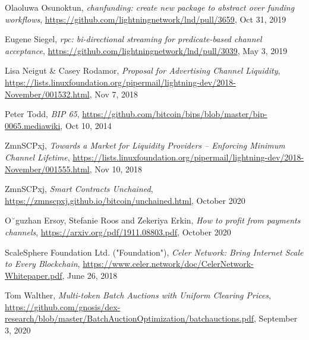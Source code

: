 \documentclass[10pt,a4paper]{article}
\theoremstyle{definition}
\begin{document}
\begin{thebibliography}{9}
    Olaoluwa Osunoktun,
    \textit{chanfunding: create new package to abstract over funding workflows},
    \url{https://github.com/lightningnetwork/lnd/pull/3659},
    Oct 31, 2019

    Eugene Siegel,
    \textit{rpc: bi-directional streaming for predicate-based channel acceptance},
    \url{https://github.com/lightningnetwork/lnd/pull/3039},
    May 3, 2019

    Lisa Neigut \& Casey Rodamor,
    \textit{Proposal for Advertising Channel Liquidity},
    \url{https://lists.linuxfoundation.org/pipermail/lightning-dev/2018-November/001532.html},
    Nov 7, 2018

    Peter Todd,
    \textit{BIP 65},
    \url{https://github.com/bitcoin/bips/blob/master/bip-0065.mediawiki},
    Oct 10, 2014

    ZmnSCPxj,
    \textit{Towards a Market for Liquidity Providers -- Enforcing Minimum Channel Lifetime},
    \url{https://lists.linuxfoundation.org/pipermail/lightning-dev/2018-November/001555.html},
    Nov 10, 2018

    ZmnSCPxj,
    \textit{Smart Contracts Unchained},
    \url{https://zmnscpxj.github.io/bitcoin/unchained.html},
    October 2020

    O˘guzhan Ersoy, Stefanie Roos and Zekeriya Erkin,
    \textit{How to profit from payments channels},
    \url{https://arxiv.org/pdf/1911.08803.pdf},
    October 2020

    ScaleSphere Foundation Ltd. ("Foundation"),
    \textit{Celer Network: Bring Internet Scale to Every Blockchain},
    \url{https://www.celer.network/doc/CelerNetwork-Whitepaper.pdf},
    June 26, 2018

    Tom Walther,
    \textit{Multi-token Batch Auctions with Uniform Clearing Prices},
    \url{https://github.com/gnosis/dex-research/blob/master/BatchAuctionOptimization/batchauctions.pdf},
    September 3, 2020


\end{thebibliography}
\end{document}
